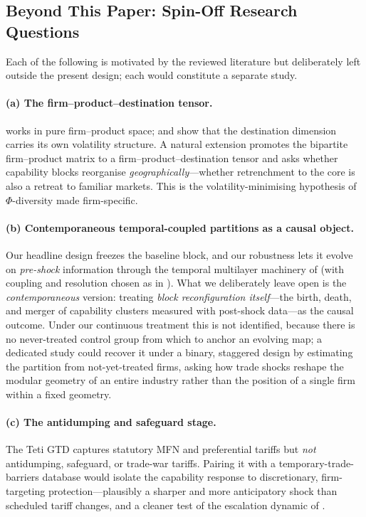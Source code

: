 \subsection{Beyond This Paper: Spin-Off Research Questions}
\label{subsec:spinoffs}

Each of the following is motivated by the reviewed literature but deliberately left
outside the present design; each would constitute a separate study.

\paragraph{(a) The firm--product--destination tensor.}
\citet{destefano2025} works in pure firm--product space; \citet{crozet2025} and
\citet{vannoorenberghe2016} show that the destination dimension carries its own
volatility structure. A natural extension promotes the bipartite firm--product matrix
to a firm--product--destination tensor and asks whether capability blocks reorganise
\emph{geographically}---whether retrenchment to the core is also a retreat to familiar
markets. This is the volatility-minimising hypothesis of $\Phi$-diversity made
firm-specific.

\paragraph{(b) Contemporaneous temporal-coupled partitions as a causal object.}
Our headline design freezes the baseline block, and our robustness lets it evolve on
\emph{pre-shock} information through the temporal multilayer machinery of \citet{mucha2010}
(with coupling and resolution chosen as in \citealp{bazzi2016}). What we deliberately leave
open is the \emph{contemporaneous} version: treating \emph{block reconfiguration itself}---the
birth, death, and merger of capability clusters measured with post-shock data---as the causal
outcome. Under our continuous treatment this is not identified, because there is no
never-treated control group from which to anchor an evolving map; a dedicated study could
recover it under a binary, staggered design by estimating the partition from not-yet-treated
firms, asking how trade shocks reshape the modular geometry of an entire industry rather than
the position of a single firm within a fixed geometry.

\paragraph{(c) The antidumping and safeguard stage.}
The Teti GTD \citep{teti2024} captures statutory MFN and preferential tariffs but
\emph{not} antidumping, safeguard, or trade-war tariffs. Pairing it with a temporary-trade-barriers
database would isolate the capability response to discretionary, firm-targeting
protection---plausibly a sharper and more anticipatory shock than scheduled tariff
changes, and a cleaner test of the escalation dynamic of \citet{evenett2024}.

